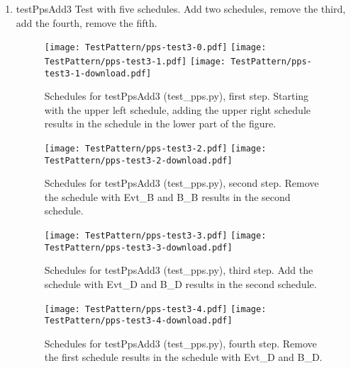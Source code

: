 \documentclass[12pt,a4paper]{report}
\begin{document}
\begin{enumerate}
\item testPpsAdd3
    Test with five schedules.
    Add two schedules, remove the third, add the fourth, remove the fifth.
    \begin{figure}
        \centering
        \texttt{[image: TestPattern/pps-test3-0.pdf]}
        \texttt{[image: TestPattern/pps-test3-1.pdf]}
        \texttt{[image: TestPattern/pps-test3-1-download.pdf]}
        \caption{Schedules for testPpsAdd3 (test\_pps.py), first step. Starting with the upper left schedule,
        adding the upper right schedule results in the schedule in the lower part of the figure.}
        \label{fig:Schedules_for_testPpsAdd3-0}
    \end{figure}
    \begin{figure}
        \centering
        \texttt{[image: TestPattern/pps-test3-2.pdf]}
        \texttt{[image: TestPattern/pps-test3-2-download.pdf]}
        \caption{Schedules for testPpsAdd3 (test\_pps.py), second step. Remove the schedule with Evt\_B and B\_B results in the second schedule.}
        \label{fig:Schedules_for_testPpsAdd3-1}
    \end{figure}
    \begin{figure}
        \centering
        \texttt{[image: TestPattern/pps-test3-3.pdf]}
        \texttt{[image: TestPattern/pps-test3-3-download.pdf]}
        \caption{Schedules for testPpsAdd3 (test\_pps.py), third step. Add the schedule with Evt\_D and B\_D results in the second schedule.}
        \label{fig:Schedules_for_testPpsAdd3-2}
    \end{figure}
    \begin{figure}
        \centering
        \texttt{[image: TestPattern/pps-test3-4.pdf]}
        \texttt{[image: TestPattern/pps-test3-4-download.pdf]}
        \caption{Schedules for testPpsAdd3 (test\_pps.py), fourth step. Remove the first schedule results in the schedule with Evt\_D and B\_D.}
        \label{fig:Schedules_for_testPpsAdd3-3}
    \end{figure}


\end{enumerate}
\end{document}
